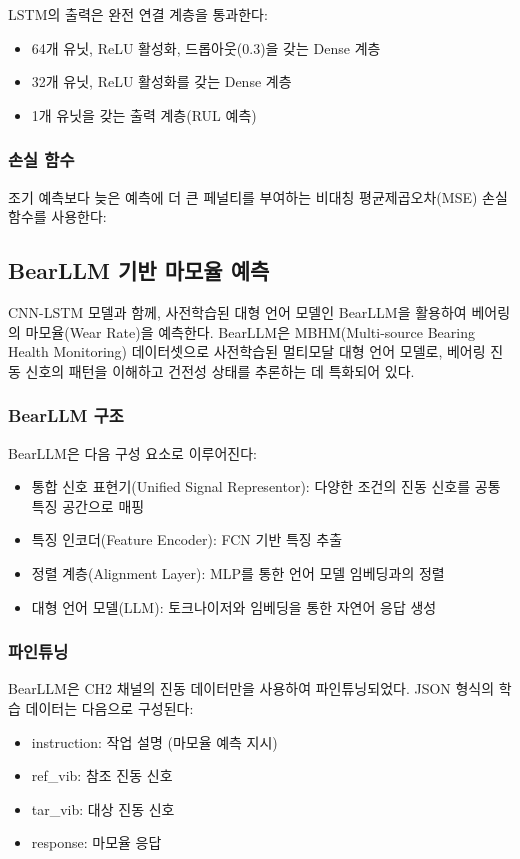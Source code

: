 \documentclass[conference,twocolumn]{IEEEtran}
\begin{document}
LSTM의 출력은 완전 연결 계층을 통과한다:
\begin{itemize}
    \item 64개 유닛, ReLU 활성화, 드롭아웃(0.3)을 갖는 Dense 계층
    \item 32개 유닛, ReLU 활성화를 갖는 Dense 계층
    \item 1개 유닛을 갖는 출력 계층(RUL 예측)
\end{itemize}

\subsubsection{손실 함수}

조기 예측보다 늦은 예측에 더 큰 페널티를 부여하는 비대칭 평균제곱오차(MSE) 손실 함수를 사용한다:

\subsection{BearLLM 기반 마모율 예측}

CNN-LSTM 모델과 함께, 사전학습된 대형 언어 모델인 BearLLM을 활용하여 베어링의 마모율(Wear Rate)을 예측한다. BearLLM은 MBHM(Multi-source Bearing Health Monitoring) 데이터셋으로 사전학습된 멀티모달 대형 언어 모델로, 베어링 진동 신호의 패턴을 이해하고 건전성 상태를 추론하는 데 특화되어 있다.

\subsubsection{BearLLM 구조}

BearLLM은 다음 구성 요소로 이루어진다:
\begin{itemize}
    \item 통합 신호 표현기(Unified Signal Representor): 다양한 조건의 진동 신호를 공통 특징 공간으로 매핑
    \item 특징 인코더(Feature Encoder): FCN 기반 특징 추출
    \item 정렬 계층(Alignment Layer): MLP를 통한 언어 모델 임베딩과의 정렬
    \item 대형 언어 모델(LLM): 토크나이저와 임베딩을 통한 자연어 응답 생성
\end{itemize}

\subsubsection{파인튜닝}

BearLLM은 CH2 채널의 진동 데이터만을 사용하여 파인튜닝되었다. JSON 형식의 학습 데이터는 다음으로 구성된다:
\begin{itemize}
    \item instruction: 작업 설명 (마모율 예측 지시)
    \item ref\_vib: 참조 진동 신호
    \item tar\_vib: 대상 진동 신호
    \item response: 마모율 응답
\end{itemize}
\end{document}
